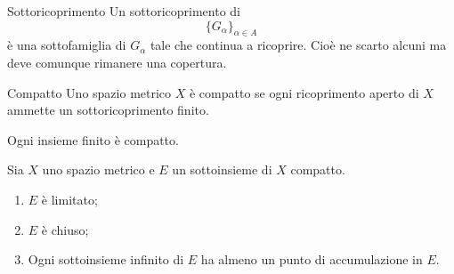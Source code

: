 \documentclass[a4paper]{article}
\begin{document}
\begin{snippetdefinition}{Sottoricoprimento}
    Un sottoricoprimento di 
    \[
        \{G_\alpha\}_{\alpha \in A}
    \]
    è una sottofamiglia di \(G_\alpha\)
    tale che continua a ricoprire. Cioè ne scarto alcuni ma deve comunque rimanere
    una copertura.
\end{snippetdefinition}

\begin{snippetdefinition}{Compatto}
    Uno spazio metrico \(X\) è compatto se ogni ricoprimento aperto di \(X\)
    ammette un sottoricoprimento finito.
\end{snippetdefinition}

Ogni insieme finito è compatto.


\begin{snippettheorem}{}
    Sia  \(X\) uno spazio metrico e \(E\) un sottoinsieme di \(X\) compatto.
    \begin{enumerate}
        \item \(E\) è limitato;
        \item \(E\) è chiuso;
        \item Ogni sottoinsieme infinito di \(E\) ha almeno un punto di accumulazione in \(E\).
    \end{enumerate}
\end{snippettheorem}
\end{document}
